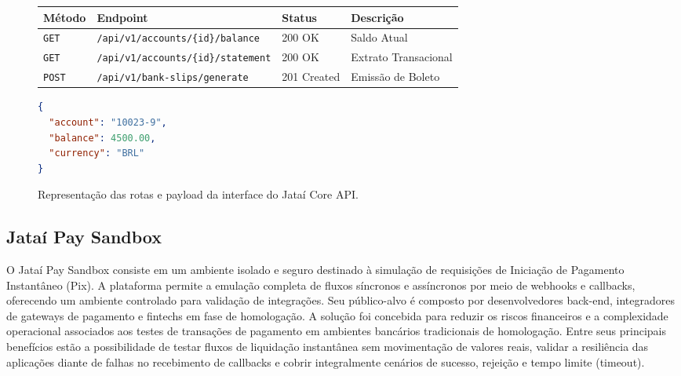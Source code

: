 \documentclass[
  12pt,
  openright,
  oneside,
  a4paper,
  brazilian
]{abntex2}
\begin{document}
\begin{figure}[htbp]
\centering
\caption{Representação das rotas e payload da interface do Jataí Core API.}
\label{fig:jatai_core_api}

\begin{tabular}{|l|l|l|p{4cm}|}
\hline
\textbf{Método} & \textbf{Endpoint} & \textbf{Status} & \textbf{Descrição} \\ \hline
\texttt{GET} & \texttt{/api/v1/accounts/\{id\}/balance} & 200 OK & Saldo Atual \\ \hline
\texttt{GET} & \texttt{/api/v1/accounts/\{id\}/statement} & 200 OK & Extrato Transacional \\ \hline
\texttt{POST} & \texttt{/api/v1/bank-slips/generate} & 201 Created & Emissão de Boleto \\ \hline
\end{tabular}

\vspace{0.8em}

\begin{minipage}{0.75\textwidth}
\begin{lstlisting}[language=json, caption={Exemplo de payload de resposta (JSON)}]
{
  "account": "10023-9",
  "balance": 4500.00,
  "currency": "BRL"
}
\end{lstlisting}
\end{minipage}

\end{figure}

\subsection{Jataí Pay Sandbox}
\label{subsec:jatai_pay_sandbox}

O Jataí Pay Sandbox consiste em um ambiente isolado e seguro destinado à simulação de requisições de Iniciação de Pagamento Instantâneo (Pix). A plataforma permite a emulação completa de fluxos síncronos e assíncronos por meio de webhooks e callbacks, oferecendo um ambiente controlado para validação de integrações. Seu público-alvo é composto por desenvolvedores back-end, integradores de gateways de pagamento e fintechs em fase de homologação. A solução foi concebida para reduzir os riscos financeiros e a complexidade operacional associados aos testes de transações de pagamento em ambientes bancários tradicionais de homologação. Entre seus principais benefícios estão a possibilidade de testar fluxos de liquidação instantânea sem movimentação de valores reais, validar a resiliência das aplicações diante de falhas no recebimento de callbacks e cobrir integralmente cenários de sucesso, rejeição e tempo limite (timeout).
\end{document}
